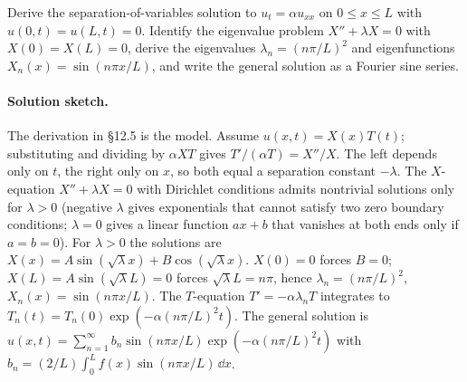 \begin{exercise}
Derive the separation-of-variables solution to $u_{t} = \alpha
u_{xx}$ on $0 \leq x \leq L$ with $u(0, t) = u(L, t) = 0$.
Identify the eigenvalue problem $X'' + \lambda X = 0$ with
$X(0) = X(L) = 0$, derive the eigenvalues $\lambda_{n} = (n
\pi/L)^{2}$ and eigenfunctions $X_{n}(x) = \sin(n \pi x/L)$, and
write the general solution as a Fourier sine series.

\paragraph{Solution sketch.}
The derivation in §12.5 is the model. Assume $u(x, t) = X(x) T(t)$;
substituting and dividing by $\alpha X T$ gives $T'/(\alpha T) =
X''/X$. The left depends only on $t$, the right only on $x$, so
both equal a separation constant $-\lambda$. The $X$-equation
$X'' + \lambda X = 0$ with Dirichlet conditions admits nontrivial
solutions only for $\lambda > 0$ (negative $\lambda$ gives
exponentials that cannot satisfy two zero boundary conditions;
$\lambda = 0$ gives a linear function $a x + b$ that vanishes at
both ends only if $a = b = 0$). For $\lambda > 0$ the solutions
are $X(x) = A \sin(\sqrt{\lambda} x) + B \cos(\sqrt{\lambda} x)$.
$X(0) = 0$ forces $B = 0$; $X(L) = A\sin(\sqrt{\lambda} L) = 0$
forces $\sqrt{\lambda} L = n\pi$, hence $\lambda_{n} =
(n\pi/L)^{2}$, $X_{n}(x) = \sin(n\pi x/L)$. The $T$-equation
$T' = -\alpha \lambda_{n} T$ integrates to $T_{n}(t) =
T_{n}(0) \exp(-\alpha (n\pi/L)^{2} t)$. The general solution is
$u(x, t) = \sum_{n=1}^{\infty} b_{n} \sin(n\pi x/L) \exp(-\alpha
(n\pi/L)^{2} t)$ with $b_{n} = (2/L)\int_{0}^{L} f(x) \sin(n\pi
x/L)\,\dd x$.
\end{exercise}

